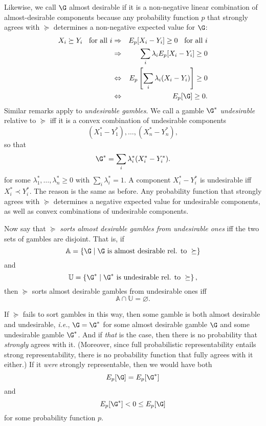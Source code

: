 Likewise, we call $\G$ almost desirable if it is a non-negative linear combination of almost-desirable components because any probability function $p$ that strongly agrees with $\succeq$ determines a non-negative expected value for $\G$:
\begin{eqnarray*}
X_i\succeq Y_i\hspace*{2mm}\text{ for all } i & \Rightarrow & E_p[X_i-Y_i]\geq 0\hspace*{2mm}\text{ for all } i\\
& \Rightarrow & \sum_i \lambda_iE_p[X_i-Y_i]\geq 0\\
& \Leftrightarrow & E_p\left[\sum_i \lambda_i(X_i-Y_i)\right]\geq 0\\
& \Leftrightarrow & E_p[\G]\geq 0.
\end{eqnarray*}
Similar remarks apply to \textit{undesirable gambles}. We call a gamble $\G^*$ \textit{undesirable} relative to $\succeq$ iff it is a convex combination of undesirable components
$$ (X^*_1-Y^*_1),\hdots,(X^*_n-Y^*_n), $$
so that 
$$ \G^*=\sum_i \lambda^*_i(X^*_i-Y^*_i). $$
for some $\lambda^*_1,\hdots,\lambda^*_n\geq0$ with $\sum_i \lambda^*_i=1$. A component $X^*_i-Y^*_i$ is undesirable iff $X^*_i\prec Y^*_i$. The reason is the same as before. Any probability function that strongly agrees with $\succeq$ determines a negative expected value for undesirable components, as well as convex combinations of undesirable components.

Now say that $\succeq$ \textit{sorts almost desirable gambles from undesirable ones} iff the two sets of gambles are disjoint. That is, if
$$ \mathbb{A}=\left\{\G \mathrel{|} \G \text{ is almost desirable rel. to } \succeq \right\} $$
and
$$ \mathbb{U}=\left\{\G^* \mathrel{|} \G^* \text{ is undesirable rel. to }\succeq\right\}, $$
then $\succeq$ sorts almost desirable gambles from undesirable ones iff
$$ \mathbb{A}\cap\mathbb{U}=\varnothing. $$

If $\succeq$ fails to sort gambles in this way, then some gamble is both almost desirable and undesirable, \textit{i.e.}, $\G=\G^*$ for some almost desirable gamble $\G$ and some undesirable gamble $\G^*$. And if \textit{that} is the case, then there is no probability that \textit{strongly} agrees with it. (Moreover, since full probabilistic representability entails strong representability, there is no probability function that fully agrees with it either.) If it \textit{were} strongly representable, then we would have both
$$ E_p[\G]=E_p[\G^*] $$
and
$$ E_p[\G^*]<0\leq E_p[\G] $$
for some probability function $p$.

